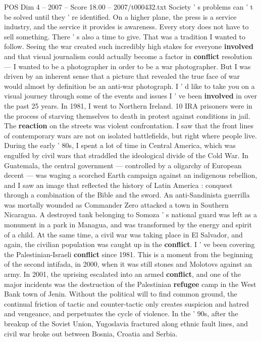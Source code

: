 \begin{textsample}{POS Dim 4 – 2007 – Score 18.00 – 2007/t000432.txt}
Society ' s problems can ' t be solved until they ' re identified.
On a higher plane, the press is a service industry, and the service it provides is awareness.
Every story does not have to sell something.
There ' s also a time to give.
That was a tradition I wanted to follow.
Seeing the war created such incredibly high stakes for everyone \textbf{involved} and that visual journalism could actually become a factor in \textbf{conflict} resolution — I wanted to be a photographer in order to be a war photographer.
But I was driven by an inherent sense that a picture that revealed the true face of war would almost by definition be an anti-war photograph.
I ' d like to take you on a visual journey through some of the events and issues I ' ve been \textbf{involved} in over the past 25 years.
In 1981, I went to Northern Ireland. 10 IRA prisoners were in the process of starving themselves to death in protest against conditions in jail.
The \textbf{reaction} on the streets was violent confrontation.
I saw that the front lines of contemporary wars are not on isolated battlefields, but right where people live.
During the early ' 80s, I spent a lot of time in Central America, which was engulfed by civil wars that straddled the ideological divide of the Cold War.
In Guatemala, the central government — controlled by a oligarchy of European decent — was waging a scorched Earth campaign against an indigenous rebellion, and I saw an image that reflected the history of Latin America : conquest through a combination of the Bible and the sword.
An anti-Sandinista guerrilla was mortally wounded as Commander Zero attacked a town in Southern Nicaragua.
A destroyed tank belonging to Somoza ' s national guard was left as a monument in a park in Managua, and was transformed by the energy and spirit of a child.
At the same time, a civil war was taking place in El Salvador, and again, the civilian population was caught up in the \textbf{conflict}.
I ' ve been covering the Palestinian-Israeli \textbf{conflict} since 1981.
This is a moment from the beginning of the second intifada, in 2000, when it was still stones and Molotovs against an army.
In 2001, the uprising escalated into an armed \textbf{conflict}, and one of the major incidents was the destruction of the Palestinian \textbf{refugee} camp in the West Bank town of Jenin.
Without the political will to find common ground, the continual friction of tactic and counter-tactic only creates suspicion and hatred and vengeance, and perpetuates the cycle of violence.
In the ' 90s, after the breakup of the Soviet Union, Yugoslavia fractured along ethnic fault lines, and civil war broke out between Bosnia, Croatia and Serbia.

\end{textsample}
